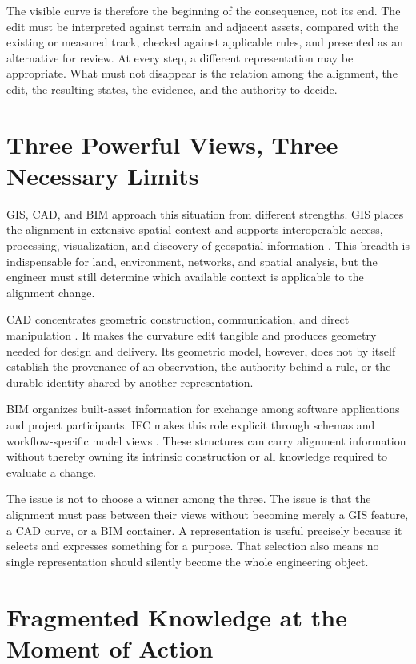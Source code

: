 The visible curve is therefore the beginning of the consequence, not its end.
The edit must be interpreted against terrain and adjacent assets, compared with
the existing or measured track, checked against applicable rules, and presented
as an alternative for review. At every step, a different representation may be
appropriate. What must not disappear is the relation among the alignment, the
edit, the resulting states, the evidence, and the authority to decide.

\section{Three Powerful Views, Three Necessary Limits}

GIS, CAD, and BIM approach this situation from different strengths. GIS places
the alignment in extensive spatial context and supports interoperable access,
processing, visualization, and discovery of geospatial information
\cite{OGCStandardsProgram2025}. This breadth is indispensable for land,
environment, networks, and spatial analysis, but the engineer must still
determine which available context is applicable to the alignment change.

CAD concentrates geometric construction, communication, and direct
manipulation \cite{KimKumarSnider2015Geometry}. It makes the curvature edit
tangible and produces geometry needed for design and delivery. Its geometric
model, however, does not by itself establish the provenance of an observation,
the authority behind a rule, or the durable identity shared by another
representation.

BIM organizes built-asset information for exchange among software applications
and project participants. IFC makes this role explicit through schemas and
workflow-specific model views \cite{BuildingSMARTIFC4x3Scope}. These structures
can carry alignment information without thereby owning its intrinsic
construction or all knowledge required to evaluate a change.

The issue is not to choose a winner among the three. The issue is that the
alignment must pass between their views without becoming merely a GIS feature,
a CAD curve, or a BIM container. A representation is useful precisely because
it selects and expresses something for a purpose. That selection also means no
single representation should silently become the whole engineering object.

\section{Fragmented Knowledge at the Moment of Action}

